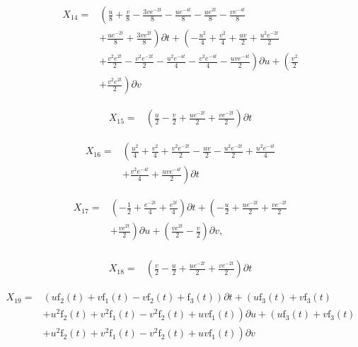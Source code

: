 \begin{align*}
X_{14}=&\left(\frac{u}{8}+\frac{v}{8}- \frac{3 v e^{- 2 t}}{8}- \frac{u e^{- 4 t}}{8}- \frac{u e^{2 t}}{8}- \frac{v e^{- 4 t}}{8}\right.\\
&+\left.\frac{u e^{- 2 t}}{8}+\frac{3 v e^{2 t}}{8} \right)\partial t+\left(- \frac{u^{2}}{4}+\frac{v^{2}}{4}+\frac{u v}{2}+\frac{u^{2} e^{- 2 t}}{2}\right.\\
&+\left.\frac{v^{2} e^{2 t}}{2}- \frac{v^{2} e^{- 2 t}}{2}- \frac{u^{2} e^{- 4 t}}{4}- \frac{v^{2} e^{- 4 t}}{4}- \frac{u v e^{- 4 t}}{2} \right)\partial u+\left(\frac{v^{2}}{2}\right.\\
&+\left.\frac{v^{2} e^{2 t}}{2} \right)\partial v
\end{align*}

\begin{align*}
X_{15}=&\left(\frac{u}{2}- \frac{v}{2}+\frac{u e^{- 2 t}}{2}+\frac{v e^{- 2 t}}{2} \right)\partial t
\end{align*}

\begin{align*}
X_{16}=&\left(\frac{u^{2}}{4}+\frac{v^{2}}{4}+\frac{v^{2} e^{- 2 t}}{2}- \frac{u v}{2}- \frac{u^{2} e^{- 2 t}}{2}+\frac{u^{2} e^{- 4 t}}{4}\right.\\
&+\left.\frac{v^{2} e^{- 4 t}}{4}+\frac{u v e^{- 4 t}}{2} \right)\partial t
\end{align*}

\begin{align*}
X_{17}=&\left(- \frac{1}{2}+\frac{e^{- 2 t}}{4}+\frac{e^{2 t}}{4} \right)\partial t+\left(- \frac{u}{2}+\frac{u e^{- 2 t}}{2}+\frac{v e^{- 2 t}}{2}\right.\\
&+\left.\frac{v e^{2 t}}{2} \right)\partial u+\left(\frac{v e^{2 t}}{2} - \frac{v}{2} \right)\partial v,\\
\end{align*}

\begin{align*}
X_{18}=&\left(\frac{v}{2}- \frac{u}{2}+\frac{u e^{- 2 t}}{2}+\frac{v e^{- 2 t}}{2} \right)\partial t
\end{align*}

\begin{align*}
X_{19}=&\left(u \operatorname{f_{2}}{\left(t \right)}+v \operatorname{f_{1}}{\left(t \right)}- v \operatorname{f_{2}}{\left(t \right)}+\operatorname{f_{3}}{\left(t \right)} \right)\partial t+\left(u \operatorname{f_{3}}{\left(t \right)}+v \operatorname{f_{3}}{\left(t \right)}\right.\\
&+\left.u^{2} \operatorname{f_{2}}{\left(t \right)}+v^{2} \operatorname{f_{1}}{\left(t \right)}- v^{2} \operatorname{f_{2}}{\left(t \right)}+u v \operatorname{f_{1}}{\left(t \right)} \right)\partial u+\left(u \operatorname{f_{3}}{\left(t \right)}+v \operatorname{f_{3}}{\left(t \right)}\right.\\
&+\left.u^{2} \operatorname{f_{2}}{\left(t \right)}+v^{2} \operatorname{f_{1}}{\left(t \right)}- v^{2} \operatorname{f_{2}}{\left(t \right)}+u v \operatorname{f_{1}}{\left(t \right)} \right)\partial v
\end{align*}



